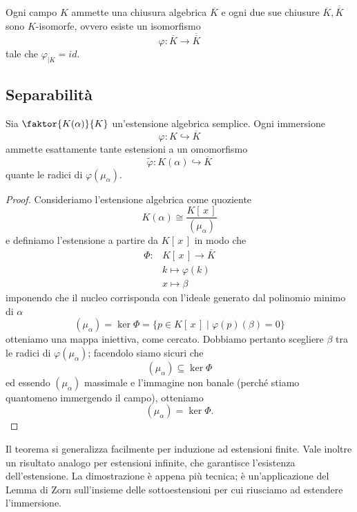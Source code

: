 \begin{multicols}{2}
\begin{theorem}
	Ogni campo $ K $ ammette una chiusura algebrica $ \overline{K} $ e ogni due sue chiusure $ \overline{K}, \overline{\overline{K}} $ sono $ K $-isomorfe, ovvero esiste un isomorfismo
	\[ \varphi : \overline{K} \to \overline{\overline{K}} \]
	tale che $ \varphi_{|K} = id $.
\end{theorem}


\end{multicols}


\subsection{Separabilità}
\begin{multicols}{2}
	
	\begin{theorem}[di immersione]\label{est}
		Sia $ \faktor{K(\alpha)}{K} $ un'estensione algebrica semplice. Ogni immersione
		\[ \varphi: K \hookrightarrow \overline{K} \]
		ammette esattamente tante estensioni a un omomorfismo
		\[ \tilde{\varphi}: K(\alpha) \hookrightarrow \overline{K} \]
		 quante le radici di $ \varphi(\mu_\alpha) $.
	\end{theorem}
	\begin{proof}
		Consideriamo l'estensione algebrica come quoziente
		\[ K(\alpha) \cong \frac{K[\, x \,]}{(\mu_\alpha)} \]
		e definiamo l'estensione a partire da $ K[\, x \,] $ in modo che
		\begin{align*}
		\Phi\colon &K[\, x \,] \to \bar{K} \\
		& k \mapsto \varphi(k) \\
		& x \mapsto \beta 
		\end{align*}
		imponendo che il nucleo corrisponda con l'ideale generato dal polinomio minimo di $ \alpha $
		\[ (\mu_\alpha) = \ker{\Phi} = \{ p \in K[\, x \,] \mid \varphi(p)(\beta) = 0 \} \]
		otteniamo una mappa iniettiva, come cercato.
		Dobbiamo pertanto scegliere $ \beta $ tra le radici di $ \varphi(\mu_\alpha) $; facendolo siamo sicuri che
		\[ (\mu_\alpha) \subseteq \ker{\Phi} \]
		ed essendo $ (\mu_\alpha) $ massimale e l'immagine non banale (perché stiamo quantomeno immergendo il campo), otteniamo
		\[ (\mu_\alpha) = \ker{\Phi} .\]
	\end{proof}
	\begin{remark}
		Il teorema si generalizza facilmente per induzione ad estensioni finite. Vale inoltre un risultato analogo per estensioni infinite, che garantisce l'esistenza dell'estensione. La dimostrazione è appena più tecnica; è un'applicazione del Lemma di Zorn sull'insieme delle sottoestensioni per cui riusciamo ad estendere l'immersione. 
	\end{remark}



\end{multicols}
